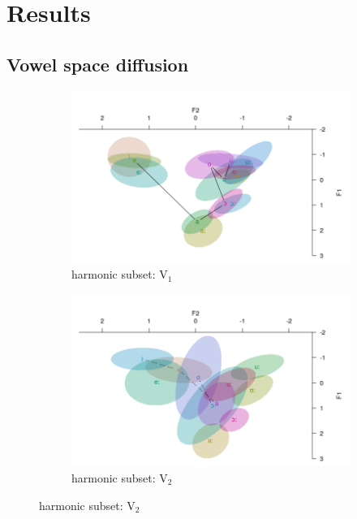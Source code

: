 \documentclass[a4paper,11pt,twocolumn]{article}
\begin{document}
\section{Results}
\subsection{Vowel space diffusion}

    \begin{figure}[!ht]
	\label{figure_combined}
	\centering
	\begin{subfigure}[t]{0.2\textwidth}
		\centering
		\includegraphics[scale=0.2]{har_v1.png} 
		\caption{harmonic subset: V$_1$} \label{har_v1}
	\end{subfigure}
	\begin{subfigure}[t]{0.2\textwidth}
		\centering
		\includegraphics[scale=0.2]{har_v2.png} 
		\caption{harmonic subset: V$_2$} \label{har_v2}
	\end{subfigure}
	

\end{figure}
\end{document}
